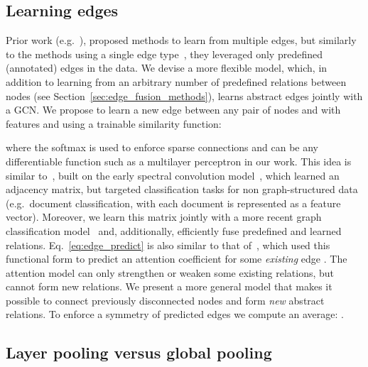 \documentclass[final,nonatbib]{article} \usepackage{nips_2018}
\begin{document}
	\subsection{Learning edges}
	\label{sec:learn_edges}
	Prior work (e.g.~\cite{schlichtkrull2018modeling,bordes2013translating}),
	proposed methods to learn from multiple edges, but similarly to the methods using a single edge type~\cite{kipf2016semi}, they leveraged only predefined (annotated) edges in the data.
	We devise a more flexible model, which, in addition to learning from an arbitrary number of predefined relations between nodes (see Section~\ref{sec:edge_fusion_methods}), learns abstract edges jointly with a GCN.
	We propose to learn a new edge  between any pair of nodes  and  with features  and  using a trainable similarity function:
	

	where the softmax is used to enforce sparse connections and  can be any differentiable function such as a multilayer perceptron in our work.
	This idea is similar to~\cite{henaff2015deep}, built on the early spectral convolution model~\cite{bruna2013spectral}, which learned an adjacency matrix, but targeted classification tasks for non graph-structured data (e.g.~document classification, with each document is represented as a feature vector). Moreover, we learn this matrix jointly with a more recent graph classification model~\cite{defferrard2016convolutional} and, additionally, efficiently fuse predefined and learned relations. Eq.~\ref{eq:edge_predict} is also similar to that of~\cite{velickovic2017graph}, which used this functional form to predict an attention coefficient  for some \textit{existing} edge . The attention model can only strengthen or weaken some existing relations, but cannot form new relations. We present a more general model that makes it possible to connect previously disconnected nodes and form \textit{new} abstract relations.
	To enforce a symmetry of predicted edges we compute an average: .

	\subsection{Layer pooling versus global pooling}
\end{document}
